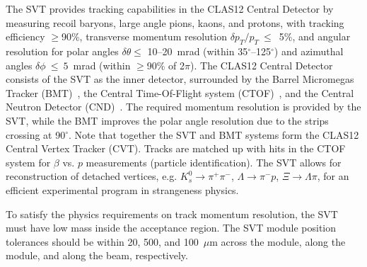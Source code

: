 The SVT provides tracking capabilities in the CLAS12 Central Detector by measuring recoil baryons, large angle
pions, kaons, and protons, with tracking efficiency $\ge$90\%, transverse momentum resolution
$\delta p_T/p_T~\le$~5\%, and angular resolution for polar angles $\delta \theta \le$ 10--20~mrad (within
35$^\circ$--125$^\circ$) and azimuthal angles $\delta \phi~\le~5$~mrad (within $\ge$90\% of 2$\pi$). The
CLAS12 Central Detector consists of the SVT as the inner detector, surrounded by the Barrel Micromegas Tracker
(BMT)~\cite{mm-nim}, the Central Time-Of-Flight system (CTOF)~\cite{ctof-nim}, and the Central Neutron Detector
(CND)~\cite{cnd-nim}. The required momentum resolution is provided by the SVT, while the BMT improves the polar
angle resolution due to the strips crossing at 90$^\circ$. Note that together the SVT and BMT systems form the
CLAS12 Central Vertex Tracker (CVT). Tracks are matched up with hits in the CTOF system for $\beta$ vs. $p$
measurements (particle identification). The SVT allows for reconstruction of detached vertices, e.g.
$K^0_s \to \pi^+\pi^-$, $\Lambda \to \pi^-p$, $\Xi \to \Lambda\pi$, for an efficient experimental program
in strangeness physics.  

To satisfy the physics requirements on track momentum resolution, the SVT must have low mass inside the acceptance
region. The SVT module position tolerances should be within 20, 500, and 100~$\mu$m across the module, along the
module, and along the beam, respectively.
